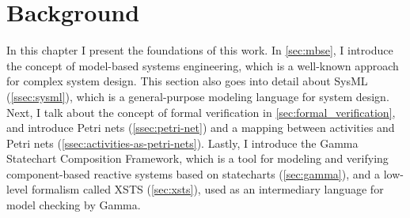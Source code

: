 \chapter{Background}\label{ch:background}

In this chapter I present the foundations of this work. In \autoref{sec:mbse}, I introduce the concept of model-based systems engineering, which is a well-known approach for complex system design. This section also goes into detail about SysML (\autoref{ssec:sysml}), which is a general-purpose modeling language for system design. Next, I talk about the concept of formal verification in \autoref{sec:formal_verification}, and introduce Petri nets (\autoref{ssec:petri-net}) and a mapping between activities and Petri nets (\autoref{ssec:activities-as-petri-nets}). Lastly, I introduce the Gamma Statechart Composition Framework, which is a tool for modeling and verifying component-based reactive systems based on statecharts (\autoref{sec:gamma}), and a low-level formalism called XSTS (\autoref{sec:xsts}), used as an intermediary language for model checking by Gamma.


%




